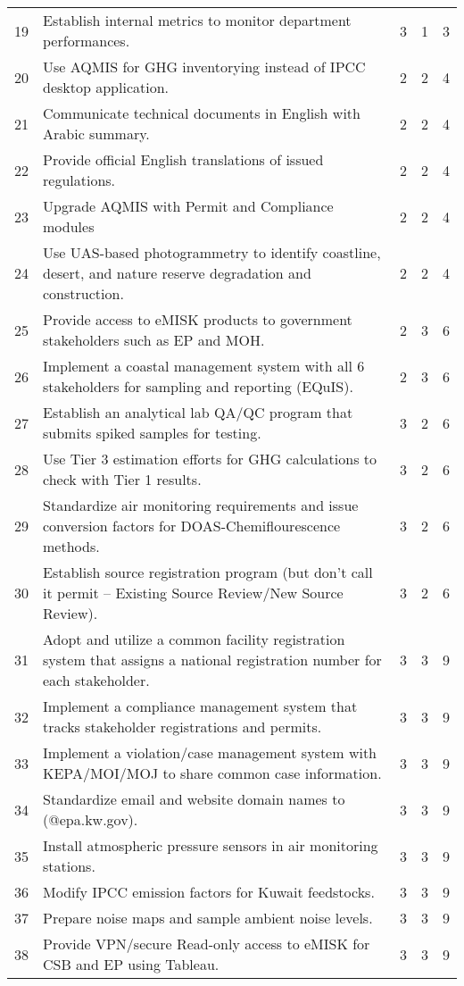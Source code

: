 \begin{table}[H]
{\begin{tabular}{@{}clccc@{}}
19 & Establish internal metrics to monitor department performances. & 3 & 1 & 3 \\
20 & Use AQMIS for GHG inventorying instead of IPCC desktop application. & 2 & 2 & 4 \\
21 & Communicate technical documents in English with Arabic summary. & 2 & 2 & 4 \\
22 & Provide official English translations of issued regulations. & 2 & 2 & 4 \\
23 & Upgrade AQMIS with Permit and Compliance modules & 2 & 2 & 4 \\
24 & Use UAS-based photogrammetry to identify coastline, desert, and nature reserve degradation and construction. & 2 & 2 & 4 \\
25 & Provide access to eMISK products to government stakeholders such as EP and MOH. & 2 & 3 & 6 \\
26 & Implement a coastal management system with all 6 stakeholders for sampling and reporting (EQuIS). & 2 & 3 & 6 \\
27 & Establish an analytical lab QA/QC program that submits spiked samples for testing. & 3 & 2 & 6 \\
28 & Use Tier 3 estimation efforts for GHG calculations to check with Tier 1 results. & 3 & 2 & 6 \\
29 & Standardize air monitoring requirements and issue conversion factors for DOAS-Chemiflourescence methods. & 3 & 2 & 6 \\
30 & Establish source registration program (but don’t call it permit – Existing Source Review/New Source Review). & 3 & 2 & 6 \\
31 & Adopt and utilize a common facility registration system that assigns a national registration number for each stakeholder. & 3 & 3 & 9 \\
32 & Implement a compliance management system that tracks stakeholder registrations and permits. & 3 & 3 & 9 \\
33 & Implement a violation/case management system with KEPA/MOI/MOJ to share common case information. & 3 & 3 & 9 \\
34 & Standardize email and website domain names to (@epa.kw.gov). & 3 & 3 & 9 \\
35 & Install atmospheric pressure sensors in air monitoring stations. & 3 & 3 & 9 \\
36 & Modify IPCC emission factors for Kuwait feedstocks. & 3 & 3 & 9 \\
37 & Prepare noise maps and sample ambient noise levels. & 3 & 3 & 9 \\
38 & Provide VPN/secure Read-only access to eMISK for CSB and EP using Tableau. & 3 & 3 & 9 \\ \bottomrule
\end{tabular}
} %
\end{table}

